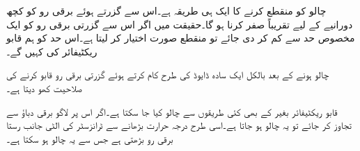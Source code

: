 چالو  کو منقطع کرنے کا ایک ہی طریقہ ہے۔اس سے گزرتے ہوئے برقی رو کو کچھ دورانیے کے لیے تقریباً صفر کرنا ہو گا۔حقیقت میں اگر اس سے گزرتی برقی رو کو  ایک مخصوص حد  سے کم کر دی جائے تو  منقطع صورت اختیار کر لیتا ہے۔اس حد کو ہم قابو ریکٹیفائر کی  کہیں گے۔

چالو ہونے کے بعد  بالکل ایک سادہ ڈایوڈ کی طرح کام کرتے ہوئے  گزرتی برقی رو قابو کرنے کی صلاحیت کھو دیتا ہے۔

قابو ریکٹیفائر بغیر  کے بھی کئی طریقوں سے چالو کیا جا سکتا ہے۔اگر اس پر لاگو برقی دباؤ  سے تجاوز کر جائے تو یہ چالو ہو جاتا ہے۔اسی طرح درجہ حرارت بڑھانے سے ٹرانزسٹر کی الٹی جانب رستا برقی رو بڑھتی ہے جس سے یہ چالو ہو سکتا ہے۔

